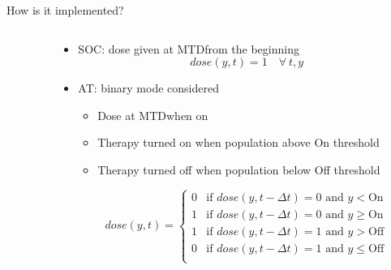 \begin{frame}{How is it implemented?}
\begin{columns}
\begin{column}{0.43\textwidth}
\begin{itemize}
      \end{itemize}
    \end{column}
    \begin{column}{0.6\textwidth}
      \begin{itemize}
        \item<4-> SOC\footnotemark[1]: dose given at MTD\footnotemark[1] from the beginning
        \begin{equation}
          dose(y,t) = 1 \quad \forall\ t, y
          \label{dose_soc_eq}
        \end{equation}
        \item<5-> AT\footnotemark[1]: binary mode considered
        \begin{itemize}
          \item Dose at MTD\footnotemark[1] when on
          \item Therapy turned on when population above On threshold
          \item Therapy turned off when population below Off threshold
        \end{itemize}
        \begin{equation}
          dose(y,t) = \begin{cases}
          0 &\text{if } dose(y,t-\Delta t) = 0 \text{ and } y < \text{On} \\
          1 &\text{if } dose(y,t-\Delta t) = 0 \text{ and } y \geq \text{On} \\
          1 &\text{if } dose(y,t-\Delta t) = 1 \text{ and } y > \text{Off} \\
          0 &\text{if } dose(y,t-\Delta t) = 1 \text{ and } y \leq \text{Off} \\
          \end{cases}
          \label{dose_at_eq}
        \end{equation}
      \end{itemize}
    \end{column}
  \end{columns}
\end{frame}

